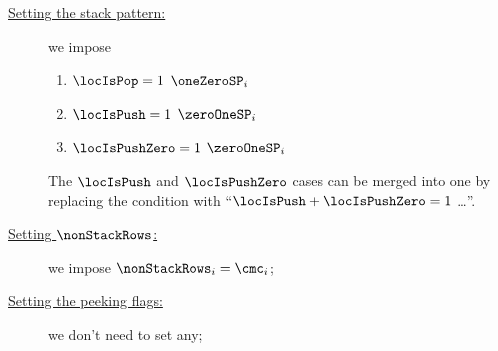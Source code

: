 \begin{center}
\end{center}

\begin{description}
	\item[\underline{Setting the stack pattern:}] we impose
	\begin{enumerate}
		\item \If $\locIsPop      = 1$ \Then $\oneZeroSP_{i}$
		\item \If $\locIsPush     = 1$ \Then $\zeroOneSP_{i}$
		\item \If $\locIsPushZero = 1$ \Then $\zeroOneSP_{i}$
	\end{enumerate}
		\saNote{}
		The $\locIsPush$ and $\locIsPushZero$ cases
		can be merged into one by replacing the condition with
		``\If $\locIsPush + \locIsPushZero = 1$ \Then \dots''.
	\item[\underline{Setting $\nonStackRows$:}]
		we impose $\nonStackRows_{i} = \cmc_{i}$;
	\item[\underline{Setting the peeking flags:}]
		we don't need to set any;


\end{description}
